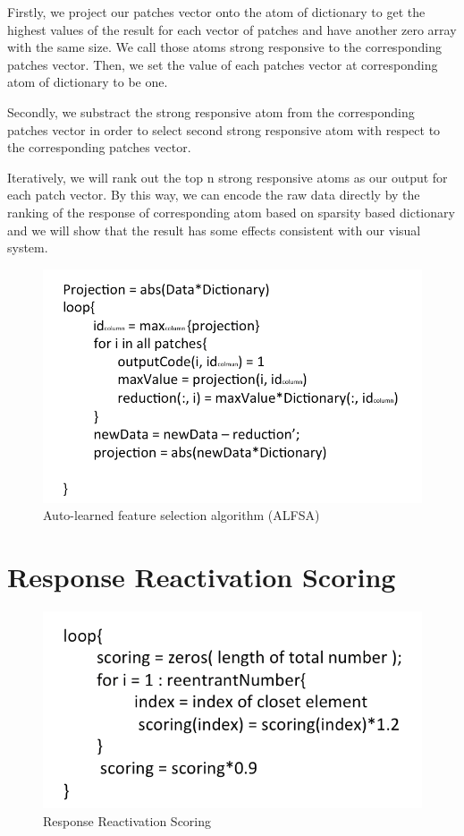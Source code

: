 \documentclass[letterpaper]{article}
\begin{document}
Firstly, we project our patches vector onto the atom of dictionary to get the highest values of the result for each vector of patches and have another zero array with the same size. We call those atoms strong responsive to the corresponding patches vector. Then, we set the value of each patches vector at corresponding atom of dictionary to be one.

Secondly, we substract the strong responsive atom from the corresponding patches vector in order to select second strong responsive atom with respect to the corresponding patches vector.

Iteratively, we will rank out the top n strong responsive atoms as our output for each patch vector. By this way, we can encode the raw data directly by the ranking of the response of corresponding atom based on sparsity based dictionary and we will show that the result has some effects consistent with our visual system.
\begin{figure}[!ht]
		\centering
		\includegraphics[width=.4\textwidth]{figures_dir/temp_algorithm1.png}
		\caption{Auto-learned feature selection algorithm (ALFSA)}
		\label{TEMP!!!Auto-learned feature selection algorithm (ALFSA)}
\end{figure}


\section{Response Reactivation Scoring}
\begin{figure}[!ht]
		\centering
		\includegraphics[width=.4\textwidth]{figures_dir/temp_algorithm2.png}
		\caption{Response Reactivation Scoring}
		\label{cottage_garden_top10_comparison}
\end{figure}
\end{document}
